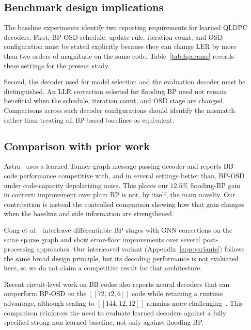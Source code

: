\documentclass[a4paper,twocolumn,11pt,nopdfoutputerror]{quantumarticle}
\newcommand{\code}[3]{\ensuremath{[\![#1,#2,#3]\!]}}
\begin{document}
\subsection{Benchmark design implications}

The baseline experiments identify two reporting requirements for learned
QLDPC decoders. First, BP-OSD schedule, update rule, iteration count, and
OSD configuration must be stated explicitly because they can change LER
by more than two orders of magnitude on the same code. Table~\ref{tab:hparams}
records these settings for the present study.

Second, the decoder used for model selection and the evaluation decoder
must be distinguished. An LLR correction selected for flooding BP need not
remain beneficial
when the schedule, iteration count, and OSD stage are changed. Comparisons
across such decoder configurations should identify the mismatch rather
than treating all BP-based baselines as equivalent.

\subsection{Comparison with prior work}\label{sec:priorwork}

Astra~\cite{Maan2025MLBP} uses a learned Tanner-graph message-passing
decoder and reports BB-code performance competitive with, and in several
settings better than, BP-OSD under code-capacity depolarizing noise. This
places our $12.5\%$ flooding-BP gain in context: improvement over plain BP
is not, by itself, the main novelty. Our contribution is instead the
controlled comparison showing how that gain changes when the baseline
and side information are strengthened.

Gong et al.~\cite{Gong2024GNN} interleave differentiable BP stages with
GNN corrections on the same sparse graph and show error-floor
improvements over several post-processing approaches. Our interleaved
variant (Appendix~\ref{app:variants}) follows the same broad design
principle, but its decoding performance is not evaluated here, so we do
not claim a competitive result for that architecture.

Recent circuit-level work on BB codes also reports neural decoders that
can outperform BP-OSD on the $\code{72}{12}{6}$ code while retaining a
runtime advantage, although scaling to $\code{144}{12}{12}$ remains more
challenging~\cite{Blue2026MLBB}. This comparison reinforces the need to evaluate learned decoders against
a fully specified strong non-learned baseline, not only against
flooding BP.
\end{document}
